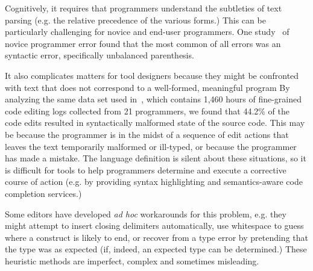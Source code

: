 
Cognitively, it requires that programmers understand the subtleties of text parsing (e.g. the relative precedence of the various forms.) This can be particularly challenging for novice and end-user programmers.
One study~\cite{Altadmri:2015:MCI:2676723.2677258} of novice programmer error found that the most common of all errors was an syntactic error, specifically unbalanced parenthesis.

It also complicates matters for tool designers because they might be confronted with text that does not correspond to a well-formed, meaningful program
By analyzing the same data set used in~\cite{6883030}, which contains 1,460 hours of fine-grained code editing logs collected from 21 programmers, we found that 44.2\% of the code edits resulted in syntactically malformed state of the source code.
This may be because the programmer is in the midst of a sequence of 
edit actions that leaves the text temporarily malformed or ill-typed, or because the programmer has made a mistake. The language definition is silent about these situations, so it is difficult for tools to help programmers determine and execute a corrective course of action (e.g. by providing syntax highlighting and semantics-aware code completion services.)

Some editors have developed \emph{ad hoc} workarounds for this problem, e.g. they might attempt to insert closing delimiters automatically, use whitespace to guess where a construct is likely to end, or recover from a type error by pretending that the type was as expected (if, indeed, an expected type can be determined.) These heuristic methods are imperfect, complex and sometimes misleading.


